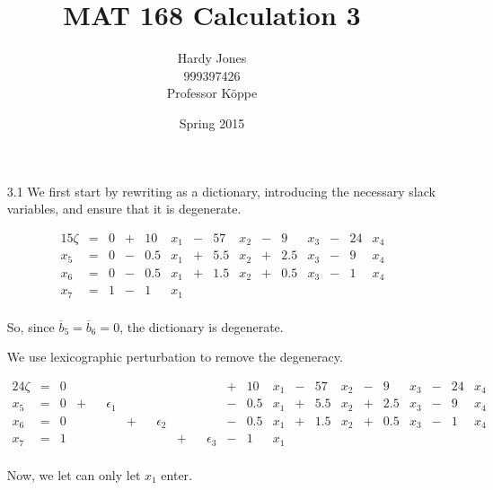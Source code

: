 \documentclass[12pt,letterpaper]{article}
\title{MAT 168 Calculation 3\vspace{-2ex}}
\author{Hardy Jones\\
        999397426\\
        Professor K\"{o}ppe\vspace{-2ex}}
\date{Spring 2015}
\newcommand*\eps{\epsilon}
\begin{document}
  \maketitle

  \begin{enumerate}
    \item [3.1]
      We first start by rewriting as a dictionary,
      introducing the necessary slack variables,
      and ensure that it is degenerate.

      \begin{alignat*}{15}
        \zeta  & {}={} & 0 & {}+{} & 10   & x_1 & {}-{} & 57   & x_2 & {}-{} &  9   & x_3 & {}-{} & 24   & x_4 \\
        x_5    & {}={} & 0 & {}-{} &  0.5 & x_1 & {}+{} &  5.5 & x_2 & {}+{} &  2.5 & x_3 & {}-{} &  9   & x_4 \\
        x_6    & {}={} & 0 & {}-{} &  0.5 & x_1 & {}+{} &  1.5 & x_2 & {}+{} &  0.5 & x_3 & {}-{} &  1   & x_4 \\
        x_7    & {}={} & 1 & {}-{} &  1   & x_1 &       &      &     &       &      &     &       &      &     \\
      \end{alignat*}

      So, since $\overline{b}_5 = \overline{b}_6 = 0$, the dictionary is degenerate.

      We use lexicographic perturbation to remove the degeneracy.

      \begin{alignat*}{24}
        \zeta & {}={} & 0 &       & &        &       & &        &       & &        & {}+{} & 10  & x_1 & {}-{} & 57  & x_2 & {}-{} & 9   & x_3 & {}-{} & 24 & x_4 \\
        x_5   & {}={} & 0 & {}+{} & & \eps_1 &       & &        &       & &        & {}-{} & 0.5 & x_1 & {}+{} & 5.5 & x_2 & {}+{} & 2.5 & x_3 & {}-{} &  9 & x_4 \\
        x_6   & {}={} & 0 &       & &        & {}+{} & & \eps_2 &       & &        & {}-{} & 0.5 & x_1 & {}+{} & 1.5 & x_2 & {}+{} & 0.5 & x_3 & {}-{} &  1 & x_4 \\
        x_7   & {}={} & 1 &       & &        &       & &        & {}+{} & & \eps_3 & {}-{} & 1   & x_1 &       &     &     &       &     &     &       &    &     \\
      \end{alignat*}

      Now, we let can only let $x_1$ enter.


\end{enumerate}
\end{document}
